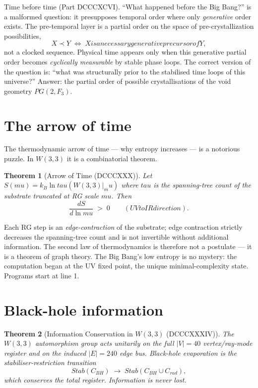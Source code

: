 \documentclass[11pt]{article}
\def\mathbb#1{#1}%
\def\mathrm#1{#1}%
\def\mathcal#1{#1}%
\def\textbf#1{#1}%
\def\text#1{#1}%
\def\mu{mu}%
\def\tau{tau}%
\newtheorem*{theorem}{Theorem}
\begin{document}
\textbf{Time before time (Part DCCCXCVI).} ``What happened before the Big Bang?'' is a malformed question: it presupposes temporal order where only \emph{generative} order exists. The pre-temporal layer is a partial order on the space of pre-crystallization possibilities,
\[
X \prec Y \;\Longleftrightarrow\; X \text{ is a necessary generative precursor of } Y,
\]
not a clocked sequence. Physical time appears only when this generative partial order becomes \emph{cyclically measurable} by stable phase loops. The correct version of the question is: ``what was structurally prior to the stabilised time loops of this universe?'' Answer: the partial order of possible crystallisations of the void geometry $\mathrm{PG}(2, \mathbb{F}_3)$.

\section{The arrow of time}

The thermodynamic arrow of time --- why entropy increases --- is a notorious puzzle. In $W(3,3)$ it is a combinatorial theorem.

\begin{theorem}[Arrow of Time (DCCCXXX)]
Let $S(\mu) = k_B \ln \tau(W(3,3)\big|_\mu)$ where $\tau$ is the spanning-tree count of the substrate truncated at RG scale $\mu$. Then
\[
\frac{dS}{d\ln\mu} \;>\; 0
\qquad\text{(UV to IR direction).}
\]
\end{theorem}

Each RG step is an \emph{edge-contraction} of the substrate; edge contraction strictly decreases the spanning-tree count and is not invertible without additional information. The second law of thermodynamics is therefore not a postulate --- it is a theorem of graph theory. The Big Bang's low entropy is no mystery: the computation began at the UV fixed point, the unique minimal-complexity state. \textbf{Programs start at line 1.}

\section{Black-hole information}

\begin{theorem}[Information Conservation in $W(3,3)$ (DCCCXXXIV)]
The $W(3,3)$ automorphism group acts unitarily on the full $|V| = 40$ vertex/ray-mode register and on the induced $|E| = 240$ edge bus. Black-hole evaporation is the stabiliser-restriction transition
\[
\mathrm{Stab}(\mathcal{C}_{BH}) \;\longrightarrow\; \mathrm{Stab}(\mathcal{C}_{BH} \cup \mathcal{C}_{\mathrm{rad}}),
\]
which conserves the total register. \textbf{Information is never lost.}
\end{theorem}
\end{document}
